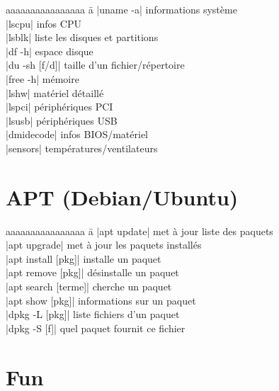 \documentclass{article}
\begin{document}
\begin{multicols}{4}
    \begin{tabbing}
        aaaaaaaaaaaaaaaa \= a \kill
        \code|uname -a| \> informations système \\
        \code|lscpu| \> infos CPU \\
        \code|lsblk| \> liste les disques et partitions \\
        \code|df -h| \> espace disque \\
        \code|du -sh [f/d]| \> taille d'un fichier/répertoire \\
        \code|free -h| \> mémoire \\
        \code|lshw| \> matériel détaillé \\
        \code|lspci| \> périphériques PCI \\
        \code|lsusb| \> périphériques USB \\
        \code|dmidecode| \> infos BIOS/matériel \\
        \code|sensors| \> températures/ventilateurs
    \end{tabbing}

    \section*{APT (Debian/Ubuntu)}
    \begin{tabbing}
        aaaaaaaaaaaaaaaa \= a \kill
        \code|apt update| \> met à jour liste des paquets \\
        \code|apt upgrade| \> met à jour les paquets installés \\
        \code|apt install [pkg]| \> installe un paquet \\
        \code|apt remove [pkg]| \> désinstalle un paquet \\
        \code|apt search [terme]| \> cherche un paquet \\
        \code|apt show [pkg]| \> informations sur un paquet \\
        \code|dpkg -L [pkg]| \> liste fichiers d'un paquet \\
        \code|dpkg -S [f]| \> quel paquet fournit ce fichier
    \end{tabbing}

    \section*{Fun}


\end{multicols}
\end{document}
